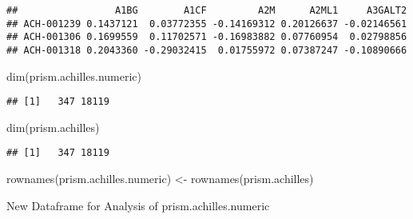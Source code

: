 \documentclass[
]{article}
\newenvironment{Shaded}{\begin{snugshade}}{\end{snugshade}}
\newcommand{\FunctionTok}[1]{\textcolor[rgb]{0.00,0.00,0.00}{#1}}
\newcommand{\NormalTok}[1]{#1}
\newcommand{\OtherTok}[1]{\textcolor[rgb]{0.56,0.35,0.01}{#1}}
\begin{document}
\begin{verbatim}
##                 A1BG        A1CF         A2M      A2ML1     A3GALT2
## ACH-001239 0.1437121  0.03772355 -0.14169312 0.20126637 -0.02146561
## ACH-001306 0.1699559  0.11702571 -0.16983882 0.07760954  0.02798856
## ACH-001318 0.2043360 -0.29032415  0.01755972 0.07387247 -0.10890666
\end{verbatim}

\begin{Shaded}
\begin{Highlighting}[]
\FunctionTok{dim}\NormalTok{(prism.achilles.numeric)}
\end{Highlighting}
\end{Shaded}

\begin{verbatim}
## [1]   347 18119
\end{verbatim}

\begin{Shaded}
\begin{Highlighting}[]
\FunctionTok{dim}\NormalTok{(prism.achilles)}
\end{Highlighting}
\end{Shaded}

\begin{verbatim}
## [1]   347 18119
\end{verbatim}

\begin{Shaded}
\begin{Highlighting}[]
\FunctionTok{rownames}\NormalTok{(prism.achilles.numeric) }\OtherTok{\textless{}{-}} \FunctionTok{rownames}\NormalTok{(prism.achilles)}
\end{Highlighting}
\end{Shaded}

New Dataframe for Analysis of prism.achilles.numeric
\end{document}
